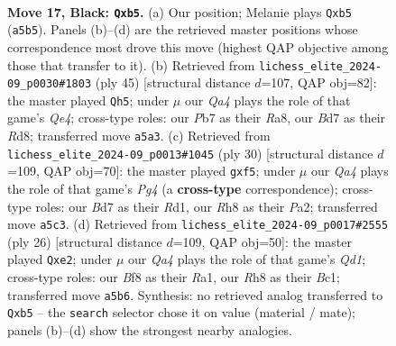 \documentclass[11pt]{article}
\begin{document}
\clearpage

\begin{figure}[p]\centering
\begin{subfigure}{0.46\textwidth}\centering
\resizebox{\linewidth}{!}{%
\newchessgame
\chessboard[
  setfen={r3kb1r/1p1bpp1n/1B1p2p1/qN5p/4P3/1PNP1P2/P4QPP/2K1R2R b kq - 0 17},
  showmover=false,
  pgfstyle=straightmove, color=movearrow, markmove={a5-b5}
]}
\caption{}
\end{subfigure}\hfill
\begin{subfigure}{0.46\textwidth}\centering
\resizebox{\linewidth}{!}{%
\newchessgame
\chessboard[
  setfen={r2r2k1/1pp2pbp/p3b3/3Nq3/4PP2/2P1Q2P/PP6/3RRBK1 b - - 0 23},
  showmover=false,
  pgfstyle=straightmove, color=movearrow, markmove={e5-h5}
]}
\caption{}
\end{subfigure}
\\[4pt]
\begin{subfigure}{0.46\textwidth}\centering
\resizebox{\linewidth}{!}{%
\newchessgame
\chessboard[
  setfen={r2q1rk1/ppp1ppn1/6pQ/4pn1b/2P3P1/2NP4/PP3P2/2KR1B1R w - - 3 16},
  showmover=false,
  pgfstyle=straightmove, color=movearrow, markmove={g4-f5}
]}
\caption{}
\end{subfigure}\hfill
\begin{subfigure}{0.46\textwidth}\centering
\resizebox{\linewidth}{!}{%
\newchessgame
\chessboard[
  setfen={r2q2k1/pp3rpp/2np1n2/2p5/2P5/2P1P1P1/P3p1BP/R1BQ1RK1 w - - 0 14},
  showmover=false,
  pgfstyle=straightmove, color=movearrow, markmove={d1-e2}
]}
\caption{}
\end{subfigure}
\caption{\textbf{Move 17, Black: \texttt{Qxb5}.} (a) Our position; Melanie plays \texttt{Qxb5} (\texttt{a5b5}). Panels (b)--(d) are the retrieved master positions whose correspondence most drove this move (highest QAP objective among those that transfer to it). (b) Retrieved from \texttt{lichess\_elite\_2024-09\_p0030\#1803} (ply 45) [structural distance $d$=107, QAP obj=82]: the master played \texttt{Qh5}; under $\mu$ our \emph{Qa4} plays the role of that game's \emph{Qe4}; cross-type roles: our \emph{P}b7 as their \emph{R}a8, our \emph{B}d7 as their \emph{R}d8; transferred move \texttt{a5a3}. (c) Retrieved from \texttt{lichess\_elite\_2024-09\_p0013\#1045} (ply 30) [structural distance $d$=109, QAP obj=70]: the master played \texttt{gxf5}; under $\mu$ our \emph{Qa4} plays the role of that game's \emph{Pg4} (a \textbf{cross-type} correspondence); cross-type roles: our \emph{B}d7 as their \emph{R}d1, our \emph{R}h8 as their \emph{P}a2; transferred move \texttt{a5c3}. (d) Retrieved from \texttt{lichess\_elite\_2024-09\_p0017\#2555} (ply 26) [structural distance $d$=109, QAP obj=50]: the master played \texttt{Qxe2}; under $\mu$ our \emph{Qa4} plays the role of that game's \emph{Qd1}; cross-type roles: our \emph{B}f8 as their \emph{R}a1, our \emph{R}h8 as their \emph{B}c1; transferred move \texttt{a5b6}. Synthesis: no retrieved analog transferred to \texttt{Qxb5} -- the \texttt{search} selector chose it on value (material / mate); panels (b)--(d) show the strongest nearby analogies.}
\label{fig:thought-m33}
\end{figure}
\end{document}
